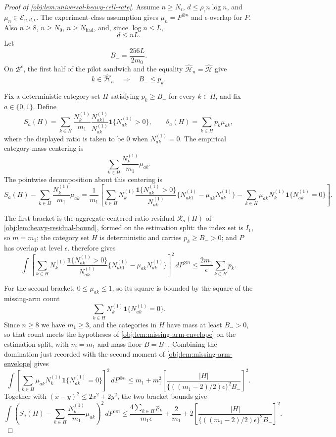 \begin{proof}[Proof of \cref{obj:lem:universal-heavy-cell-rate}]
Assume \(n\ge N_\epsilon\), \(d\le \rho_\epsilon n\log n\), and
\(\mu_n\in\mathcal E_{n,d,\epsilon}\). The experiment-class assumption gives
\(\mu_n=P^{\otimes n}\) and \(\epsilon\)-overlap for \(P\). Also
\(n\ge8\), \(n\ge N_0\), \(n\ge N_{\mathrm{bad}}\), and, since \(\log n\le L\),
\[
d\le nL.
\]
Let
\[
B_- = \frac{256L}{2m_0}.
\]
On \(\mathcal B^c\), the first half of the pilot sandwich and the equality
\(\widehat{\mathcal H}_n=\widehat{\mathcal H}\) give
\[
k\in\widehat{\mathcal H}_n
\quad\Longrightarrow\quad
B_-\le p_k .
\] %

Fix a deterministic category set \(H\) satisfying \(p_k\ge B_-\) for every \(k\in H\), and fix
\(a\in\{0,1\}\). Define
\[
S_a(H)
=
\sum_{k\in H}
\frac{N_k^{(1)}}{m_1}
\frac{N_{ak1}^{(1)}}{N_{ak}^{(1)}}
\mathbf 1\{N_{ak}^{(1)}>0\},
\qquad
\theta_a(H)=\sum_{k\in H}p_k\mu_{ak},
\]
where the displayed ratio is taken to be \(0\) when \(N_{ak}^{(1)}=0\). The empirical
category-mass centering is
\[
\sum_{k\in H}\frac{N_k^{(1)}}{m_1}\mu_{ak}.
\]
The pointwise decomposition about this centering is
\[
S_a(H)-\sum_{k\in H}\frac{N_k^{(1)}}{m_1}\mu_{ak}
=
\frac1{m_1}
\left[
\sum_{k\in H}
N_k^{(1)}\frac{\mathbf 1\{N_{ak}^{(1)}>0\}}{N_{ak}^{(1)}}
\{N_{ak1}^{(1)}-\mu_{ak}N_{ak}^{(1)}\}
-
\sum_{k\in H}\mu_{ak}N_k^{(1)}\mathbf 1\{N_{ak}^{(1)}=0\}
\right].
\] %

The first bracket is the aggregate centered ratio residual \(\mathcal R_a(H)\) of
\cref{obj:lem:heavy-residual-bound}, formed on the estimation split: the index set is \(I_1\),
so \(m=m_1\); the category set \(H\) is deterministic and carries \(p_k\ge B_->0\); and \(P\)
has overlap at level \(\epsilon\).  therefore gives
\[
\int
\left[
\sum_{k\in H}
N_k^{(1)}\frac{\mathbf 1\{N_{ak}^{(1)}>0\}}{N_{ak}^{(1)}}
\{N_{ak1}^{(1)}-\mu_{ak}N_{ak}^{(1)}\}
\right]^2
\,dP^{\otimes n}
\le
\frac{2m_1}{\epsilon}\sum_{k\in H}p_k .
\] %

For the second bracket, \(0\le\mu_{ak}\le1\), so its square is bounded by the square of the
missing-arm count
\[
\sum_{k\in H}N_k^{(1)}\mathbf 1\{N_{ak}^{(1)}=0\}.
\]
Since \(n\ge8\) we have \(m_1\ge3\), and the categories in \(H\) have mass at least \(B_->0\), so
that count meets the hypotheses of \cref{obj:lem:missing-arm-envelope} on the estimation split,
with \(m=m_1\) and mass floor \(B=B_-\). Combining the domination just recorded with the second
moment of \cref{obj:lem:missing-arm-envelope} gives
\[
\int
\left[
\sum_{k\in H}\mu_{ak}N_k^{(1)}\mathbf 1\{N_{ak}^{(1)}=0\}
\right]^2
\,dP^{\otimes n}
\le
m_1+m_1^2
\left[
\frac{|H|}
{\{((m_1-2)/2)\epsilon\}^2 B_-}
\right]^2 .
\] %
Together with \((x-y)^2\le2x^2+2y^2\), the two bracket bounds give
\[
\int
\left(
S_a(H)-\sum_{k\in H}\frac{N_k^{(1)}}{m_1}\mu_{ak}
\right)^2
\,dP^{\otimes n}
\le
\frac{4\sum_{k\in H}p_k}{m_1\epsilon}
+
\frac2{m_1}
+
2\left[
\frac{|H|}
{\{((m_1-2)/2)\epsilon\}^2 B_-}
\right]^2 .
\] %


\end{proof}
